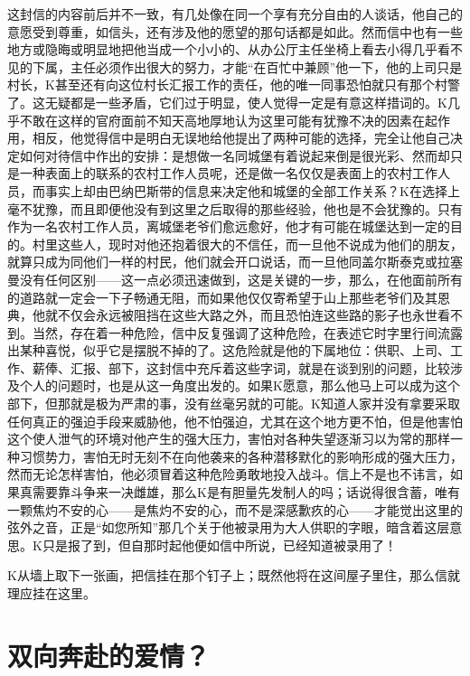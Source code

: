 \documentclass[12pt,a4paper]{article}
\begin{document}
这封信的内容前后并不一致，有几处像在同一个享有充分自由的人谈话，他自己的意愿受到尊重，如信头，还有涉及他的愿望的那句话都是如此。然而信中也有一些地方或隐晦或明显地把他当成一个小小的、从办公厅主任坐椅上看去小得几乎看不见的下属，主任必须作出很大的努力，才能“在百忙中兼顾”他一下，他的上司只是村长，K甚至还有向这位村长汇报工作的责任，他的唯一同事恐怕就只有那个村警了。这无疑都是一些矛盾，它们过于明显，使人觉得一定是有意这样措词的。K几乎不敢在这样的官府面前不知天高地厚地认为这里可能有犹豫不决的因素在起作用，相反，他觉得信中是明白无误地给他提出了两种可能的选择，完全让他自己决定如何对待信中作出的安排：是想做一名同城堡有着说起来倒是很光彩、然而却只是一种表面上的联系的农村工作人员呢，还是做一名仅仅是表面上的农村工作人员，而事实上却由巴纳巴斯带的信息来决定他和城堡的全部工作关系？K在选择上毫不犹豫，而且即便他没有到这里之后取得的那些经验，他也是不会犹豫的。只有作为一名农村工作人员，离城堡老爷们愈远愈好，他才有可能在城堡达到一定的目的。村里这些人，现时对他还抱着很大的不信任，而一旦他不说成为他们的朋友，就算只成为同他们一样的村民，他们就会开口说话，而一旦他同盖尔斯泰克或拉塞曼没有任何区别——这一点必须迅速做到，这是关键的一步，那么，在他面前所有的道路就一定会一下子畅通无阻，而如果他仅仅寄希望于山上那些老爷们及其恩典，他就不仅会永远被阻挡在这些大路之外，而且恐怕连这些路的影子也永世看不到。当然，存在着一种危险，信中反复强调了这种危险，在表述它时字里行间流露出某种喜悦，似乎它是摆脱不掉的了。这危险就是他的下属地位：供职、上司、工作、薪俸、汇报、部下，这封信中充斥着这些字词，就是在谈到别的问题，比较涉及个人的问题时，也是从这一角度出发的。如果K愿意，那么他马上可以成为这个部下，但那就是极为严肃的事，没有丝毫另就的可能。K知道人家并没有拿要采取任何真正的强迫手段来威胁他，他不怕强迫，尤其在这个地方更不怕，但是他害怕这个使人泄气的环境对他产生的强大压力，害怕对各种失望逐渐习以为常的那样一种习惯势力，害怕无时无刻不在向他袭来的各种潜移默化的影响形成的强大压力，然而无论怎样害怕，他必须冒着这种危险勇敢地投入战斗。信上不是也不讳言，如果真需要靠斗争来一决雌雄，那么K是有胆量先发制人的吗；话说得很含蓄，唯有一颗焦灼不安的心——是焦灼不安的心，而不是深感歉疚的心——才能觉出这里的弦外之音，正是“如您所知”那几个关于他被录用为大人供职的字眼，暗含着这层意思。K只是报了到，但自那时起他便如信中所说，已经知道被录用了！

K从墙上取下一张画，把信挂在那个钉子上；既然他将在这间屋子里住，那么信就理应挂在这里。
\par{}
\newpage
\section{双向奔赴的爱情？}
\vspace{0.5em}
\vspace{0.3em}
\end{document}
